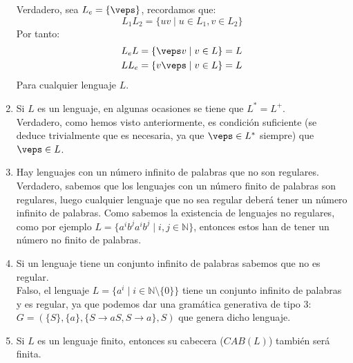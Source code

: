 \begin{enumerate}
        Verdadero, sea $L_e = \{\veps\}$, recordamos que:
        \begin{equation*}
            L_1L_2 = \{uv \mid u\in L_1, v\in L_2\}
        \end{equation*}
        Por tanto:
        \begin{gather*}
            L_e L = \{\veps v \mid v\in L\} = L \\
            L L_e = \{v\veps \mid v\in L\} = L
        \end{gather*}
        Para cualquier lenguaje $L$.
    \item Si $L$ es un lenguaje, en algunas ocasiones se tiene que $L^\ast = L^+$.\\

        Verdadero, como hemos visto anteriormente, es condición suficiente (se deduce trivialmente que es necesaria, ya que $\veps \in L^\ast$ siempre) que $\veps \in L$.
    \item Hay lenguajes con un número infinito de palabras que no son regulares.\\

        Verdadero, sabemos que los lenguajes con un número finito de palabras son regulares, luego cualquier lenguaje que no sea regular deberá tener un número infinito de palabras. Como sabemos la existencia de lenguajes no regulares, como por ejemplo $L = \{a^ib^ja^i b^j \mid i,j\in \mathbb{N}\}$, entonces estos han de tener un número no finito de palabras.
    \item Si un lenguaje tiene un conjunto infinito de palabras sabemos que no es regular.\\

        Falso, el lenguaje $L=\{a^i \mid i \in \mathbb{N}\setminus \{0\}\}$ tiene un conjunto infinito de palabras y es regular, ya que podemos dar una gramática generativa de tipo 3:\newline $G=(\{S\}, \{a\}, \{S\rightarrow aS, S\rightarrow a\}, S)$ que genera dicho lenguaje.
    \item Si $L$ es un lenguaje finito, entonces su cabecera ($CAB(L)$) también será finita.\\


\end{enumerate}
